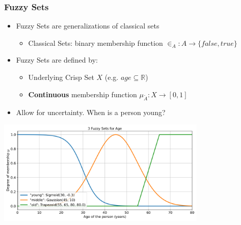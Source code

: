 \documentclass[
	10pt,
	t		%
]{beamer}
\begin{document}
\begin{frame}
	\frametitle{Fuzzy Sets}
	\begin{itemize}
		\item Fuzzy Sets are generalizations of classical sets
		      \begin{itemize}
			      \item Classical Sets: binary membership function $\in_A : A \rightarrow \{false, true\}$
		      \end{itemize}
		\item Fuzzy Sets are defined by:
		      \begin{itemize}
			      \item Underlying Crisp Set $X$ (e.g. $age \subseteq \mathbb{R}$)
			      \item \textbf{Continuous} membership function $\mu_{\tilde{A}} : X  \rightarrow [0,1]$
		      \end{itemize}
		\item Allow for uncertainty. When is a person young?
	\end{itemize}
	\begin{center}
		\includegraphics[width=0.75\textwidth,trim={0 0 0 0.85cm},clip]{figures/age-fuzzy-sets.png}
	\end{center}
\end{frame}
\end{document}
